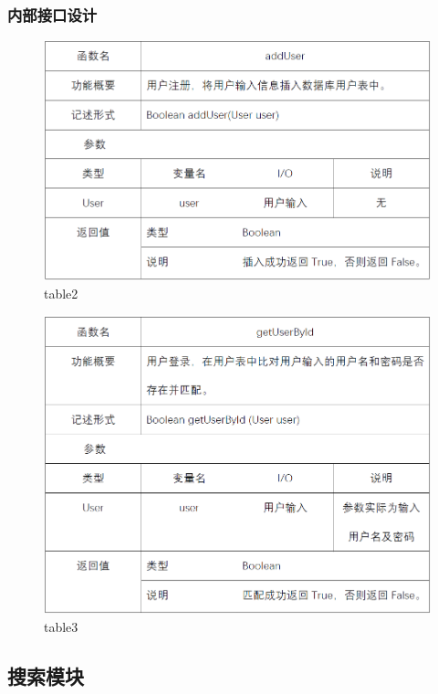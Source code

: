 \subsubsection{内部接口设计}
\begin{figure}[!htb]
	\centering
	\includegraphics[scale=1]{image/b2.png} %
	\caption{table2} %
\end{figure}
\begin{figure}[!htb]
	\centering
	\includegraphics[scale=1]{image/b3.png} %
	\caption{table3} %
\end{figure}
\subsection{搜索模块}
